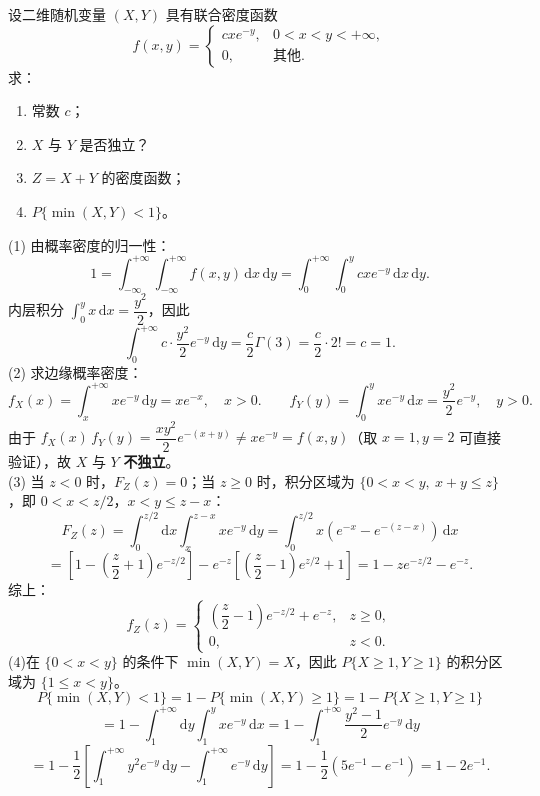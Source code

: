 \documentclass[lang=cn,11pt]{elegantbook}
\begin{document}
\begin{exercise} \label{exer:3-12e}
设二维随机变量 $(X,Y)$ 具有联合密度函数
\[
f(x,y) = \begin{cases} cxe^{-y}, & 0 < x < y < +\infty, \\ 0, & \text{其他}. \end{cases}
\]
求：
\begin{enumerate}
    \item[(1)] 常数 $c$；
    \item[(2)] $X$ 与 $Y$ 是否独立？
    \item[(3)] $Z = X + Y$ 的密度函数；
    \item[(4)] $P\{\min(X,Y) < 1\}$。
\end{enumerate}
\end{exercise}
\begin{solution}
(1) 由概率密度的归一性：
\[
1 = \int_{-\infty}^{+\infty}\int_{-\infty}^{+\infty}f(x,y)\,\mathrm{d}x\,\mathrm{d}y = \int_0^{+\infty}\int_0^y cxe^{-y}\,\mathrm{d}x\,\mathrm{d}y.
\]
内层积分 $\int_0^y x\,\mathrm{d}x = \dfrac{y^2}{2}$，因此
\[
\int_0^{+\infty}c \cdot \frac{y^2}{2}e^{-y}\,\mathrm{d}y = \frac{c}{2}\Gamma(3) = \frac{c}{2} \cdot 2! = c = 1.
\]
(2) 求边缘概率密度：
\[
f_X(x) = \int_x^{+\infty}xe^{-y}\,\mathrm{d}y = xe^{-x}, \quad x > 0. \qquad f_Y(y) = \int_0^y xe^{-y}\,\mathrm{d}x = \frac{y^2}{2}e^{-y}, \quad y > 0.
\]
由于 $f_X(x)\,f_Y(y) = \dfrac{xy^2}{2}e^{-(x+y)} \neq xe^{-y} = f(x,y)$（取 $x=1, y=2$ 可直接验证），故 $X$ 与 $Y$ \textbf{不独立}。\\
(3) 当 $z < 0$ 时，$F_Z(z) = 0$；当 $z \geqslant 0$ 时，积分区域为 $\{0 < x < y,\ x+y \leqslant z\}$，即 $0 < x < z/2$，$x < y \leqslant z-x$：
\[
F_Z(z) = \int_0^{z/2}\mathrm{d}x\int_x^{z-x}xe^{-y}\,\mathrm{d}y = \int_0^{z/2}x(e^{-x} - e^{-(z-x)})\,\mathrm{d}x
\]
\[
= \left[1 - \left(\frac{z}{2}+1\right)e^{-z/2}\right] - e^{-z}\left[\left(\frac{z}{2}-1\right)e^{z/2} + 1\right] = 1 - ze^{-z/2} - e^{-z}.
\]
综上：
\[
f_Z(z) = \begin{cases} \left(\dfrac{z}{2}-1\right)e^{-z/2} + e^{-z}, & z \geqslant 0, \\ 0, & z < 0. \end{cases}
\]
(4)在 $\{0 < x < y\}$ 的条件下 $\min(X,Y) = X$，因此 $P\{X \geqslant 1, Y \geqslant 1\}$ 的积分区域为 $\{1 \leqslant x < y\}$。
\[
P\{\min(X,Y) < 1\} = 1 - P\{\min(X,Y) \geqslant 1\} = 1 - P\{X \geqslant 1, Y \geqslant 1\}
\]
\[
= 1 - \int_1^{+\infty}\mathrm{d}y\int_1^y xe^{-y}\,\mathrm{d}x = 1 - \int_1^{+\infty}\frac{y^2-1}{2}e^{-y}\,\mathrm{d}y
\]
\[
= 1 - \frac{1}{2}\left[\int_1^{+\infty}y^2 e^{-y}\,\mathrm{d}y - \int_1^{+\infty}e^{-y}\,\mathrm{d}y\right] = 1 - \frac{1}{2}(5e^{-1} - e^{-1}) = 1 - 2e^{-1}.
\]
\end{solution}
\end{document}
